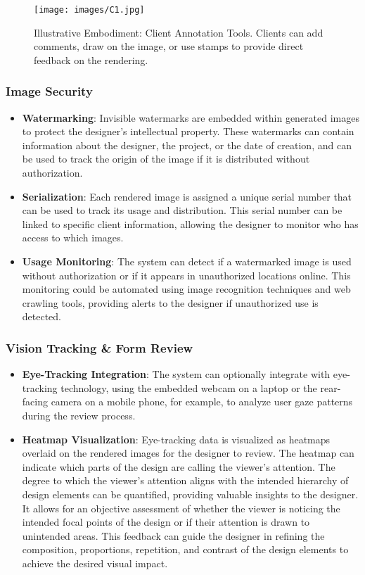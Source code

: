 \documentclass{article}
\begin{document}
\begin{figure}
\centering
\texttt{[image: images/C1.jpg]}
\caption{Illustrative Embodiment: Client Annotation Tools. Clients can add comments, draw on the image, or use stamps to provide direct feedback on the rendering.}
\label{fig:client-annotation}
\end{figure}

\subsubsection{Image Security}
\begin{itemize}
\item \textbf{Watermarking}: Invisible watermarks are embedded within generated images to protect the designer's intellectual property. These watermarks can contain information about the designer, the project, or the date of creation, and can be used to track the origin of the image if it is distributed without authorization.
\item \textbf{Serialization}: Each rendered image is assigned a unique serial number that can be used to track its usage and distribution. This serial number can be linked to specific client information, allowing the designer to monitor who has access to which images.
\item \textbf{Usage Monitoring}: The system can detect if a watermarked image is used without authorization or if it appears in unauthorized locations online. This monitoring could be automated using image recognition techniques and web crawling tools, providing alerts to the designer if unauthorized use is detected.
\end{itemize}

\subsubsection{Vision Tracking \& Form Review}
\begin{itemize}
\item \textbf{Eye-Tracking Integration}: The system can optionally integrate with eye-tracking technology, using the embedded webcam on a laptop or the rear-facing camera on a mobile phone, for example, to analyze user gaze patterns during the review process.
\item \textbf{Heatmap Visualization}: Eye-tracking data is visualized as heatmaps overlaid on the rendered images for the designer to review. The heatmap can indicate which parts of the design are calling the viewer's attention. The degree to which the viewer's attention aligns with the intended hierarchy of design elements can be quantified, providing valuable insights to the designer. It allows for an objective assessment of whether the viewer is noticing the intended focal points of the design or if their attention is drawn to unintended areas. This feedback can guide the designer in refining the composition, proportions, repetition, and contrast of the design elements to achieve the desired visual impact.
\end{itemize}
\end{document}
